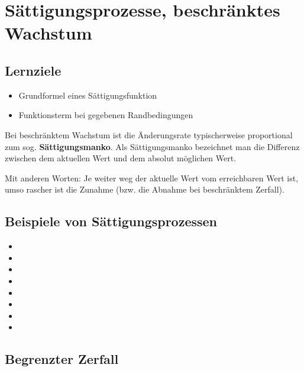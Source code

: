 \section{Sättigungsprozesse, beschränktes Wachstum}

\subsection*{Lernziele}
\begin{itemize}
	\item Grundformel eines Sättigungsfunktion
  \item Funktionsterm bei gegebenen Randbedingungen 
\end{itemize}

Bei beschränktem Wachstum ist die Änderungsrate typischerweise proportional zum sog. \textbf{Sättigungsmanko}. Als Sättigungsmanko bezeichnet man die Differenz zwischen dem aktuellen Wert und dem absolut möglichen Wert.

Mit anderen Worten: Je weiter weg der aktuelle Wert vom erreichbaren Wert ist, umso rascher ist die Zunahme (bzw. die Abnahme bei beschränktem Zerfall).

\subsection{Beispiele von Sättigungsprozessen}
\begin{itemize}
	\item {}
	\item {}
	\item {}
	\item {}
	\item {}
	\item {}
        \item {}
        \item \Lueckentext{\dotfill}
\end{itemize}
\newpage


\subsection{Begrenzter Zerfall}

